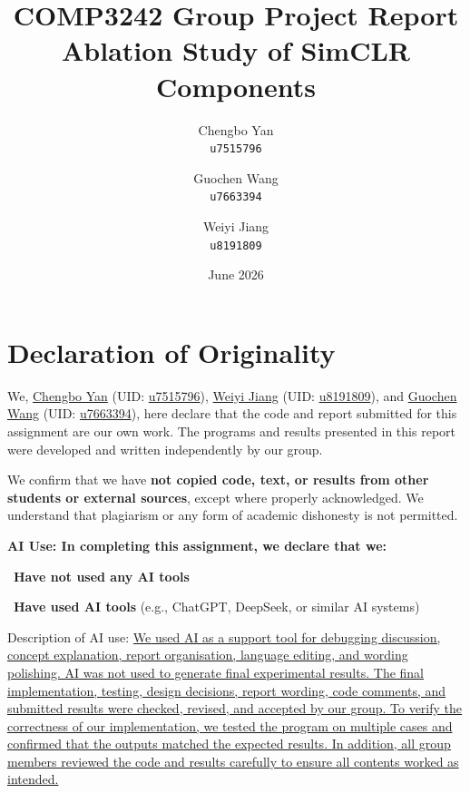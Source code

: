 \documentclass[10pt]{article}
\title{COMP3242 Group Project Report\\Ablation Study of SimCLR Components}
\author{
Chengbo Yan \\ \texttt{u7515796}
\and
Guochen Wang \\ \texttt{u7663394}
\and
Weiyi Jiang \\ \texttt{u8191809}
}
\date{June 2026}
\begin{document}
\maketitle

\section*{Declaration of Originality}

We, \underline{Chengbo Yan} (UID: \underline{u7515796}), \underline{Weiyi Jiang} (UID: \underline{u8191809}), and \underline{Guochen Wang} (UID: \underline{u7663394}), here declare that the code and report submitted for this assignment are our own work. The programs and results presented in this report were developed and written independently by our group.

\vspace{0.8em}

We confirm that we have \textbf{not copied code, text, or results from other students or external sources}, except where properly acknowledged. We understand that plagiarism or any form of academic dishonesty is not permitted.

\vspace{0.8em}

\textbf{AI Use: In completing this assignment, we declare that we:}

\fbox{\rule{0pt}{1.1ex}\rule{1.1ex}{0pt}}~\textbf{Have not used any AI tools}

~\textbf{Have used AI tools} (e.g., ChatGPT, DeepSeek, or similar AI systems)

\vspace{0.8em}

Description of AI use: \uline{We used AI as a support tool for debugging discussion, concept explanation, report organisation, language editing, and wording polishing. AI was not used to generate final experimental results. The final implementation, testing, design decisions, report wording, code comments, and submitted results were checked, revised, and accepted by our group. To verify the correctness of our implementation, we tested the program on multiple cases and confirmed that the outputs matched the expected results. In addition, all group members reviewed the code and results carefully to ensure all contents worked as intended.}

\vspace{0.8em}
\end{document}

